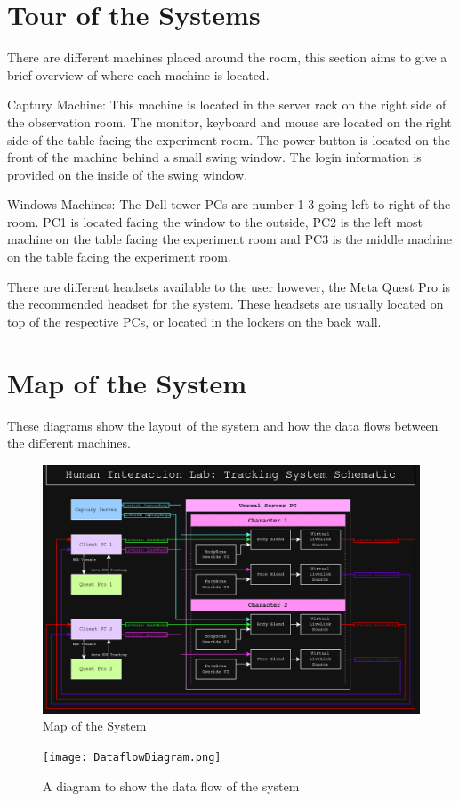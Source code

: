 \section{Tour of the Systems}
There are different machines placed around the room, this section aims to give a brief overview of where each machine is located.

Captury Machine: This machine is located in the server rack on the right side of the observation room. The monitor, keyboard and mouse are located on the right side of the table facing the experiment room. The power button is located on the front of the machine behind a small swing window. The login information is provided on the inside of the swing window.

Windows Machines: The Dell tower PCs are number 1-3 going left to right of the room. PC1 is located facing the window to the outside, PC2 is the left most machine on the table facing the experiment room and PC3 is the middle machine on the table facing the experiment room.

There are different headsets available to the user however, the Meta Quest Pro is the recommended headset for the system. These headsets are usually located on top of the respective PCs, or located in the lockers on the back wall.

\section{Map of the System}
These diagrams show the layout of the system and how the data flows between the different machines.
\begin{figure}[H]
    \centering
    \includegraphics[width=\textwidth]{images/HILCircuitDiagram.png}
    \caption{Map of the System}
    \label{fig:system_map}
\end{figure}

\begin{figure}[H]
    \centering
    \texttt{[image: DataflowDiagram.png]}
    \caption{A diagram to show the data flow of the system}
    \label{fig:system_map_alt}
\end{figure}
